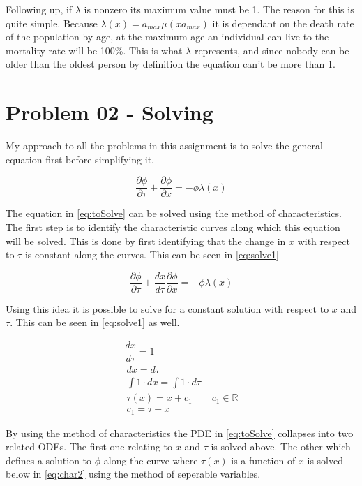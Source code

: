 \documentclass[paper=a4, fontsize=11pt]{scrartcl} %
\numberwithin{equation}{section} %
\numberwithin{figure}{section} %
\numberwithin{table}{section} %
\begin{document}
Following up, if $\lambda$ is nonzero its maximum value must be 1. The reason for this is quite simple. Because $\lambda(x) = a_{max}\mu(x a_{max})$ it is dependant on the death rate of the population by age, at the maximum age an individual can live to the mortality rate will be 100\%. This is what $\lambda$ represents, and since nobody can be older than the oldest person by definition the equation can't be more than 1.

\section*{Problem 02 - Solving}
My approach to all the problems in this assignment is to solve the general equation first before simplifying it.

\begin{equation} \label{eq:toSolve}
		\dfrac{\partial\phi}{\partial\tau} + \dfrac{\partial\phi}{\partial x}= -\phi\lambda(x)
\end{equation}

The equation in \ref{eq:toSolve} can be solved using the method of characteristics. The first step is to identify the characteristic curves along which this equation will be solved. This is done by first identifying that the change in $x$ with respect to $\tau$ is constant along the curves. This can be seen in \ref{eq:solve1}

\begin{equation}
	\dfrac{\partial\phi}{\partial\tau} + \dfrac{dx}{d\tau}\dfrac{\partial\phi}{\partial x}= -\phi\lambda(x)
\end{equation}

Using this idea it is possible to solve for a constant solution with respect to $x$ and $\tau$. This can be seen in \ref{eq:solve1} as well.

	\begin{align} \label{eq:solve1}
		\dfrac{dx}{d\tau} = 1 \\
		~
		dx = d\tau \\
		~
		\int{1\cdot dx} = \int{1\cdot d\tau}\\
		~
		\tau(x) = x + c_1 \qquad c_1 \in \mathbb{R}\\
		~
		c_1 = \tau-x
	\end{align}

By using the method of characteristics the PDE in \ref{eq:toSolve} collapses into two related ODEs. The first one relating to $x$ and $\tau$ is solved above. The other which defines a solution to $\phi$ along the curve where $\tau(x)$ is a function of $x$ is solved below in \ref{eq:char2} using the method of seperable variables.
\end{document}
